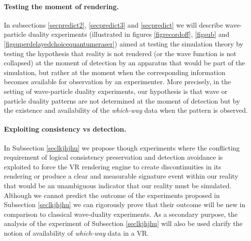\documentclass[11pt]{article}
\theoremstyle{definition}
\begin{document}
\paragraph{Testing the moment of rendering.}
In subsections  \ref{secpredict2}, \ref{secpredict3} and \ref{secpredict} we will describe wave-particle duality experiments (illustrated in figures  \ref{figrecordoff}, \ref{figsub} and \ref{figsuperdelayedchoicequantumeraser})  aimed at testing the
 simulation theory by testing the hypothesis that reality is not rendered (or the wave function is not collapsed) at the moment of detection by an apparatus that would be part of the simulation, but rather at the moment when the corresponding information becomes available for observation by an experimenter. More precisely, in the setting of wave-particle duality experiments, our hypothesis is that wave or particle duality patterns are not determined at the moment of detection but by the existence and availability of the \emph{which-way} data when the pattern is observed.

\paragraph{Exploiting consistency vs detection.}
In Subsection \ref{seclkjhjhu} we propose though experiments  where the conflicting requirement of  logical consistency preservation and  detection avoidance is exploited to force the VR rendering engine  to create discontinuities in its rendering or  produce a clear and measurable signature event within our reality that would be an unambiguous indicator that our reality must be simulated. Although we cannot predict the outcome of the experiments proposed in Subsection \ref{seclkjhjhu} we can rigorously prove that their outcome will be new in comparison to classical wave-duality experiments.
As a secondary purpose, the analysis of the experiment of Subsection \ref{seclkjhjhu} will also be  used
 clarify the notion of availability of \emph{which-way} data in a VR.
\end{document}
